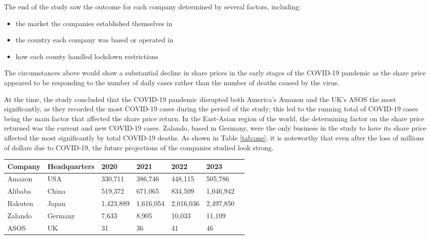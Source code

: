 \documentclass[12pt]{article}
\begin{document}
The end of the study saw the outcome for each company determined by several factors, including:
\begin{itemize}
\item the market the companies established themselves in
\item the country each company was based or operated in 
\item how each county handled lockdown restrictions
\end{itemize}
The circumstances above would show a substantial decline in share prices in the early stages of the COVID-19 pandemic as the share price appeared to be responding to the number of daily cases rather than the number of deaths caused by the virus. \par

At the time, the study concluded that the COVID-19 pandemic disrupted both America’s Amazon and the UK’s ASOS the most significantly, as they recorded the most COVID-19 cases during the period of the study; this led to the running total of COVID-19 cases being the main factor that affected the share price return. In the East-Asian region of the world, the determining factor on the share price returned was the current and new COVID-19 cases. Zalando, based in Germany, were the only business in the study to have its share price affected the most significantly by total COVID-19 deaths. As shown in Table \ref{tab:one}, it is noteworthy that even after the loss of millions of dollars due to COVID-19, the future projections of the companies studied look strong. \par

\vspace{0.5cm}
\begin{center}
    \begin{tabular}{l l l l l l l}
        \toprule
        \textbf{Company} & \textbf{Headquarters} & \textbf{2020} & \textbf{2021} & \textbf{2022} & \textbf{2023}\\
        \midrule
            Amazon & USA & 330,711 & 386,746 & 448,115 & 505,786 \\
            Alibaba	& China & 519,372 & 671,065 & 834,509 & 1,046,942 \\
            Rakuten & Japan & 1,423,889 & 1,616,054 & 2,016,036 & 2,497,850 \\
            Zalando & Germany & 7,633 & 8,905 & 10,033 & 11,109 \\
            ASOS & UK & 31 & 36 & 41 & 46 \\
        \bottomrule
    \end{tabular}
    \label{tab:one}
\end{center}
\vspace{0.5cm}
\end{document}
